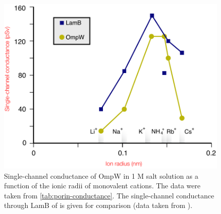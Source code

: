 \begin{figure}[htb]
  	\begin{center}
   		\includegraphics[]{porin_chapter/img/Fig4-conductancegraph.pdf}
   	\end{center}
   	\caption[Single-channel conductance of OmpW in 1 M salt solution as a function of the ionic radii of monovalent cations]{
Single-channel conductance of OmpW in 1 M salt solution as a function of the ionic radii of monovalent cations. 
The data were taken from \cref{tab:porin-conductance}. The single-channel conductance through LamB of \ecoli is given for comparison (data taken from ).
   	}
   	\label{fig:porin-ionicradii}
\end{figure}   


